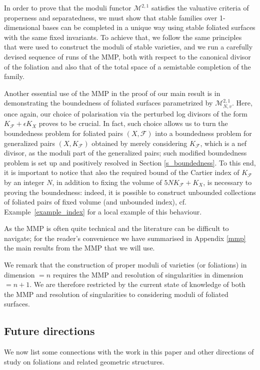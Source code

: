 \documentclass[12pt, a4paper]{amsart}
\theoremstyle{definition}
\theoremstyle{named}
\begin{document}
In order to prove that the moduli functor
$\mathcal{M}^{2, 1}$
satisfies the valuative criteria of properness and separatedness, we must show that stable families over 1-dimensional bases can be completed in a unique way using stable foliated surfaces with the same fixed invariants.
To achieve that, we follow the same principles that were used to construct the moduli of stable varieties, and we run a carefully devised sequence of runs of the MMP, both with respect to the canonical divisor of the foliation and also that of the total space of a semistable completion of the family.


Another essential use of the MMP in the proof of our main result is in demonstrating the boundedness of foliated surfaces parametrized by 
$\mathcal{M}^{2, 1}_{N, v}$.
Here, once again, our choice of polarisation via the perturbed log divisors of the form
$K_{\mathcal F}+\epsilon K_X$
proves to be crucial.
In fact, such choice allows us to turn the boundedness problem for foliated pairs 
$(X, \mathcal F)$ 
into a boundedness problem for generalized pairs
$(X, K_{\mathcal F})$
obtained by merely considering 
$K_\mathcal{F}$, which is a nef divisor, as the moduli part of the generalized pairs; such modified boundedness problem is set up and positively resolved in Section \ref{s_boundedness}.
To this end, it is important to notice that also the required bound of the Cartier index of $K_\mathcal{F}$ by an integer $N$, in addition to fixing the volume of $5NK_\mathcal{F}+K_X$, is necessary to proving the boundedness:
indeed, it is possible to construct unbounded collections of foliated pairs of fixed volume (and unbounded index), cf. Example~\ref{example_index} for a local example of this behaviour.

As the MMP is often quite technical and the literature can be difficult to navigate; for the reader's convenience we have summarised in Appendix \ref{mmp} the main results from the MMP that we will use.

We remark that the construction of proper moduli of varieties (or foliations) in dimension $=n$ requires the MMP and resolution of singularities in dimension $=n+1$.  We are therefore restricted by the current state of knowledge of both the MMP and resolution of singularities to considering moduli of foliated surfaces.






\subsection{Future directions}
We now list some connections with the work in this paper and other directions of study on foliations and related geometric structures.
\end{document}
